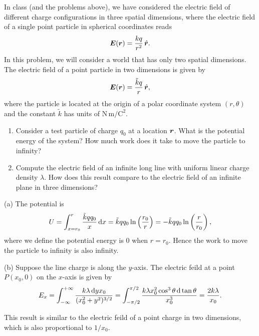 \documentclass{article}
\begin{document}
\begin{problem}
In class (and the problems above), we have considered the electric field of different charge configurations in three spatial dimensions, where the electric field of a single point particle in spherical coordinates reads
\[ \boldsymbol{E}(\boldsymbol{r}) = \frac{kq}{r^2}\,\hat{\boldsymbol{r}}. \]
In this problem, we will consider a world that has only two spatial dimensions. The electric field of a point particle in two dimensions is given by
\[ \boldsymbol{E}(\boldsymbol{r}) = \frac{\tilde{k}q}{r}\,\hat{\boldsymbol{r}}, \]
where the particle is located at the origin of a polar coordinate system $(r,\theta)$ and the constant $\tilde{k}$ has units of $\mathrm{N\,m/C^2}$.
\begin{enumerate}[label=(\alph*)]
  \item Consider a test particle of charge $q_0$ at a location $\boldsymbol{r}$. What is the potential energy of the system? How much work does it take to move the particle to infinity?
  \item Compute the electric field of an infinite long line with uniform linear charge density $\lambda$. How does this result compare to the electric field of an infinite plane in three dimensions?
\end{enumerate}
\end{problem}

\begin{solution}
  (a) The potential is
  \[ U=\int_{x=r_0}^{r}\frac{\tilde{k}qq_0}{x}\,\mathrm{d} x = \tilde{k}qq_0\ln\left(\frac{r_0}{r}\right) = -\tilde{k}qq_0\ln\left( \frac{r}{r_0} \right), \]
  where we define the potential energy is \( 0 \) when \( r=r_0 \). Hence the work to move the particle to infinity is also infinity.\par
  (b) Suppose the line charge is along the \( y \)-axis. The electric feild at a point \( P(x_0,0) \) on the \( x \)-axis is given by
  \[ E_x=\int_{-\infty}^{+\infty}\frac{k\lambda\,\mathrm{d} y x_0}{(x_0^2+y^2)^{3/2}}
  =\int_{-\pi/2}^{\pi/2}\frac{k \lambda x_0^2\cos^3\theta\,\mathrm{d}\tan\theta}{x_0^3}
  =\frac{2k\lambda}{x_0}. \]\par
  This result is similar to the electric feild of a point charge in two dimensions, which is also proportional to \( 1/x_0 \).
\end{solution}
\end{document}
